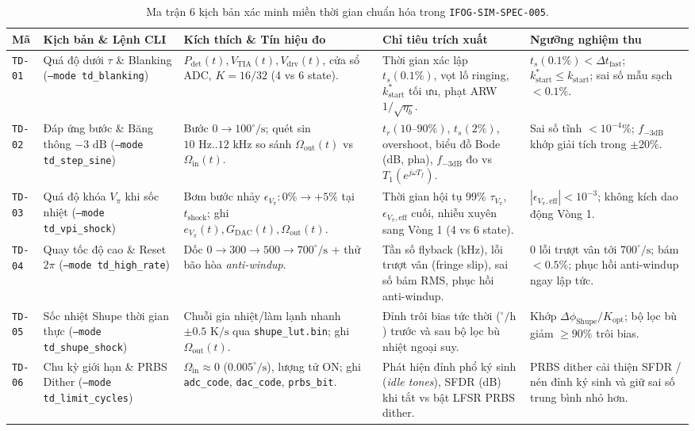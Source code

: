\documentclass[11pt, a4paper]{article}
\begin{document}
\begin{table}[htbp]
\centering
\caption{Ma trận 6 kịch bản xác minh miền thời gian chuẩn hóa trong \texttt{IFOG-SIM-SPEC-005}.}
\label{tab:td_scenarios}
\footnotesize
\renewcommand{\arraystretch}{1.22}
\begin{tabular}{@{}L{1.5cm} L{3.0cm} L{3.3cm} L{4.2cm} L{3.4cm}@{}}
\toprule
\textbf{Mã} & \textbf{Kịch bản \& Lệnh CLI} & \textbf{Kích thích \& Tín hiệu đo} & \textbf{Chỉ tiêu trích xuất} & \textbf{Ngưỡng nghiệm thu} \\
\midrule
\texttt{TD-01} & Quá độ dưới $\tau$ \& Blanking (\texttt{--mode td\_blanking}) & $P_{\text{det}}(t), V_{\text{TIA}}(t), V_{\text{drv}}(t)$, cửa sổ ADC, $K=16/32$ (4 vs 6 state). & Thời gian xác lập $t_s(0.1\%)$, vọt lố ringing, $k_{\text{start}}^*$ tối ưu, phạt ARW $1/\sqrt{\eta_b}$. & $t_s(0.1\%) < \Delta t_{\text{fast}}$; $k_{\text{start}}^* \le k_{\text{start}}$; sai số mẫu sạch $< 0.1\%$. \\
\texttt{TD-02} & Đáp ứng bước \& Băng thông $-3\text{ dB}$ (\texttt{--mode td\_step\_sine}) & Bước $0 \to 100^\circ/\text{s}$; quét sin $10\text{ Hz}..12\text{ kHz}$ so sánh $\Omega_{\text{out}}(t)$ vs $\Omega_{\text{in}}(t)$. & $t_r(10\text{--}90\%)$, $t_s(2\%)$, overshoot, biểu đồ Bode (dB, pha), $f_{-3\text{dB}}$ đo vs $T_1(e^{j\omega T_f})$. & Sai số tĩnh $< 10^{-4}\%$; $f_{-3\text{dB}}$ khớp giải tích trong $\pm 20\%$. \\
\texttt{TD-03} & Quá độ khóa $V_\pi$ khi sốc nhiệt (\texttt{--mode td\_vpi\_shock}) & Bơm bước nhảy $\epsilon_{V_\pi}: 0\% \to +5\%$ tại $t_{\text{shock}}$; ghi $e_{V_\pi}(t), G_{\text{DAC}}(t), \Omega_{\text{out}}(t)$. & Thời gian hội tụ 99\% $\tau_{V_\pi}$, $\epsilon_{V_\pi,\text{eff}}$ cuối, nhiễu xuyên sang Vòng 1 (4 vs 6 state). & $|\epsilon_{V_\pi,\text{eff}}| < 10^{-3}$; không kích dao động Vòng 1. \\
\texttt{TD-04} & Quay tốc độ cao \& Reset $2\pi$ (\texttt{--mode td\_high\_rate}) & Dốc $0 \to 300 \to 500 \to 700^\circ/\text{s}$ + thử bão hòa \emph{anti-windup}. & Tần số flyback (kHz), lỗi trượt vân (fringe slip), sai số bám RMS, phục hồi anti-windup. & 0 lỗi trượt vân tới $700^\circ/\text{s}$; bám $< 0.5\%$; phục hồi anti-windup ngay lập tức. \\
\texttt{TD-05} & Sốc nhiệt Shupe thời gian thực (\texttt{--mode td\_shupe\_shock}) & Chuỗi gia nhiệt/làm lạnh nhanh $\pm 0.5\text{ K/s}$ qua \texttt{shupe\_lut.bin}; ghi $\Omega_{\text{out}}(t)$. & Đỉnh trôi bias tức thời ($^\circ/\text{h}$) trước và sau bộ lọc bù nhiệt ngoại suy. & Khớp $\Delta\phi_{\text{Shupe}}/K_{\text{opt}}$; bộ lọc bù giảm $\ge 90\%$ trôi bias. \\
\texttt{TD-06} & Chu kỳ giới hạn \& PRBS Dither (\texttt{--mode td\_limit\_cycles}) & $\Omega_{\text{in}} \approx 0$ ($0.005^\circ/\text{s}$), lượng tử ON; ghi \texttt{adc\_code}, \texttt{dac\_code}, \texttt{prbs\_bit}. & Phát hiện đỉnh phổ ký sinh (\emph{idle tones}), SFDR (dB) khi tắt vs bật LFSR PRBS dither. & PRBS dither cải thiện SFDR / nén đỉnh ký sinh và giữ sai số trung bình nhỏ hơn. \\
\bottomrule
\end{tabular}
\end{table}
\end{document}
